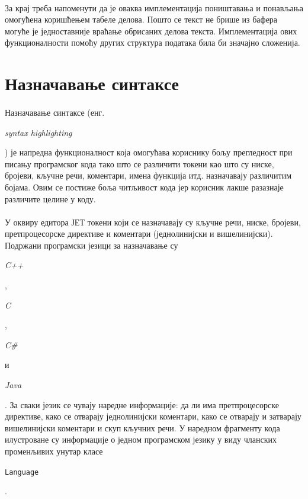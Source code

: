 \documentclass[12pt,oneside]{memoir}
\begin{document}
\paragraph{}
За крај треба напоменути да је оваква имплементација поништавања и понављања
омогућена коришћењем табеле делова. Пошто се текст не брише из бафера могуће
је једноставније враћање обрисаних делова текста. Имплементација ових 
функционалности помоћу других структура података била би значајно сложенија.

\section{Назначавање синтаксе}

\paragraph{}
Назначавање синтаксе (енг. \begin{latinica}\textit{syntax highlighting}\end{latinica})
је напредна функционалност која омогућава кориснику бољу прегледност при писању
програмског кода тако што се различити токени као што су ниске, бројеви, кључне речи, коментари, имена функција итд. назначавају различитим бојама.  Овим се постиже боља читљивост кода јер корисник лакше разазнаје различите целине у коду.

\paragraph{}
У оквиру едитора ЈЕТ токени који се назначавају су кључне речи, ниске, бројеви, претпроцесорске директиве и коментари (једнолинијски и вишелинијски).
Подржани програмски језици за назначавање су
\begin{latinica}\textit{C++}\end{latinica}, \begin{latinica}\textit{C}\end{latinica},
\begin{latinica}\textit{C\#}\end{latinica} и \begin{latinica}\textit{Java}\end{latinica}. За сваки језик се чувају
наредне информације: да ли има претпроцесорске директиве, како
се отварају једнолинијски коментари, како се отварају и затварају вишелинијски
коментари и скуп кључних речи. У наредном фрагменту кода илустроване су
информације о једном програмском језику у виду чланских променљивих унутар класе \begin{latinica}\verb|Language|\end{latinica}.
\end{document}
